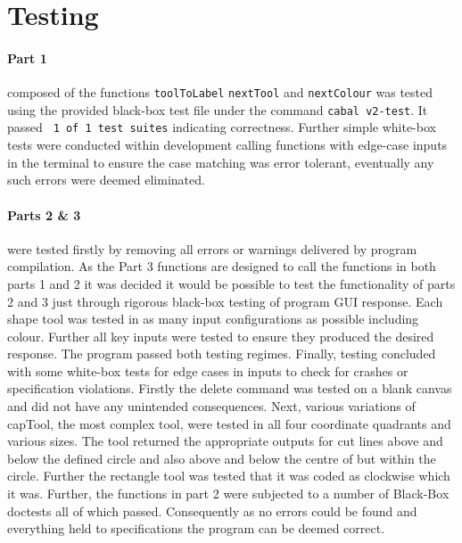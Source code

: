 \documentclass[11pt]{article}
\begin{document}

\section{Testing}%
\paragraph{Part 1} 
 composed of the functions \verb|toolToLabel| \verb|nextTool| and \verb|nextColour| was tested using the provided black-box test file under the command \verb|cabal v2-test|. It passed \verb| 1 of 1 test suites| indicating correctness. Further simple white-box tests were conducted within development calling functions with edge-case inputs in the terminal to ensure the case matching was error tolerant, eventually any such errors were deemed eliminated.
 
\paragraph{Parts 2 \& 3} 
were tested firstly by removing all errors or warnings delivered by program compilation. As the Part 3 functions are designed to call the functions in both parts 1 and 2 it was decided it would be possible to test the functionality of parts 2 and 3 just through rigorous black-box testing of program GUI response. Each shape tool was tested in as many input configurations as possible including colour. Further all key inputs were tested to ensure they produced the desired response. The program passed both testing regimes. Finally, testing concluded with some white-box tests for edge cases in inputs to check for crashes or specification violations. Firstly the delete command was tested on a blank canvas and did not have any unintended consequences. Next, various variations of capTool, the most complex tool, were tested in all four coordinate quadrants and various sizes. The tool returned the appropriate outputs for cut lines above and below the defined circle and also above and below the centre of but within the circle. Further the rectangle tool was tested that it was coded as clockwise which it was. Further, the functions in part 2 were subjected to a number of Black-Box doctests all of which passed. Consequently as no errors could be found and everything held to specifications the program can be deemed correct.
\end{document}
